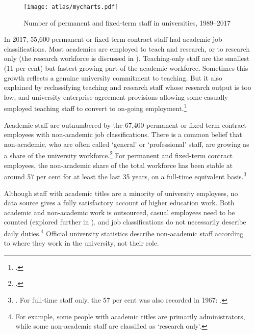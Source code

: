 \documentclass{grattan}
\begin{document}
    \begin{figure} %
    \caption{Number of permanent and fixed-term staff in universities, 1989--2017}\label{fig:number-of-permanent-and-fixedterm-staff-in-universities-19892017}
    \texttt{[image: atlas/mycharts.pdf]}
    \end{figure}
In 2017, 55,600 permanent or fixed-term contract staff had academic job classifications. Most academics are employed to teach and research, or to research only (the research workforce is discussed in ). Teaching-only staff are the smallest (11 per cent) but fastest growing part of the academic workforce. Sometimes this growth reflects a genuine university commitment to teaching. But it also explained by reclassifying teaching and research staff whose research output is too low, and university enterprise agreement provisions allowing some casually-employed teaching staff to convert to on-going employment.\footcites[][]{Probert2013teachingfocusedac}[][]{Andrews2016contingentacademic}

Academic staff are outnumbered by the 67,400 permanent or fixed-term contract employees with non-academic job classifications. There is a common belief that non-academic, who are often called `general' or `professional' staff, are growing as a share of the university workforce.\footcite[][chapter~7.]{Forsyth2014ahistoryofthemo} For permanent and fixed-term contract employees, the non-academic share of the total workforce has been stable at around 57 per cent for at least the last 35 years, on a full-time equivalent basis.\footnote{\textcites[][table~1.2]{DepartmentofEducationandTraining2017studentsselected}[][137]{DEET1993nationalreporton}. For full-time staff only, the 57 per cent was also recorded in 1967: \textcite[][]{CommonwealthBureauofCensusandStatistics1967socialstatisticsa}.}

Although staff with academic titles are a minority of university employees, no data source gives a fully satisfactory account of higher education work. Both academic and non-academic work is outsourced, casual employees need to be counted (explored further in ), and job classifications do not necessarily describe daily duties.\footnote{For example, some people with academic titles are primarily administrators, while some non-academic staff are classified as `research only'.} Official university statistics describe non-academic staff according to where they work in the university, not their role.
\end{document}
